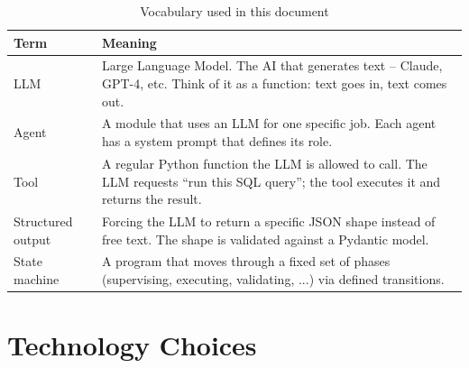 \documentclass[12pt,a4paper]{article}
\begin{document}
\begin{table}[H]
\centering
\small
\begin{tabular}{@{}p{3.2cm}p{10.5cm}@{}}
\toprule
\textbf{Term} & \textbf{Meaning} \\
\midrule
LLM & Large Language Model. The AI that generates text -- Claude, GPT-4, etc. Think of it as a function: text goes in, text comes out. \\
\addlinespace
Agent & A module that uses an LLM for one specific job. Each agent has a system prompt that defines its role. \\
\addlinespace
Tool & A regular Python function the LLM is allowed to call. The LLM requests ``run this SQL query''; the tool executes it and returns the result. \\
\addlinespace
Structured output & Forcing the LLM to return a specific JSON shape instead of free text. The shape is validated against a Pydantic model. \\
\addlinespace
State machine & A program that moves through a fixed set of phases (supervising, executing, validating, ...) via defined transitions. \\
\bottomrule
\end{tabular}
\caption{Vocabulary used in this document}
\end{table}


\section{Technology Choices}
\end{document}
